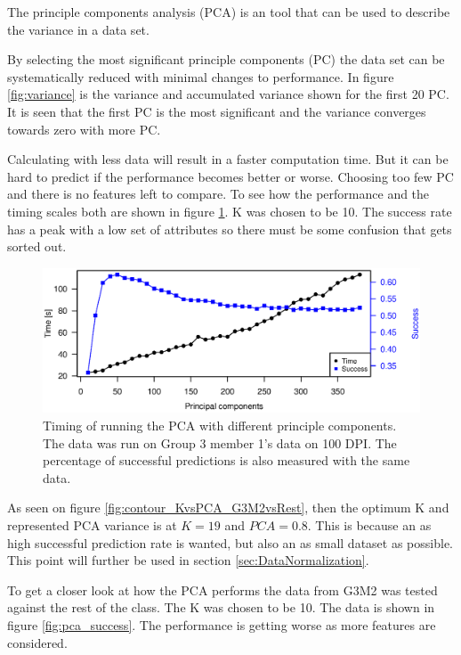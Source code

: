 The principle components analysis (PCA) is an tool that can be used to describe the variance in a data set.

By selecting the most significant principle components (PC) the data set can be systematically reduced with minimal changes to performance.
In figure \ref{fig:variance} is the variance and accumulated variance shown for the first 20 PC. 
It is seen that the first PC is the most significant and the variance converges towards zero with more PC.

Calculating with less data will result in a faster computation time. But it can be hard to predict if the performance becomes better or worse.
Choosing too few PC and there is no features left to compare.
To see how the performance and the timing scales both are shown in figure \ref{fig:pca_timing}. K was chosen to be 10.
The success rate has a peak with a low set of attributes so there must be some confusion that gets sorted out. 

\begin{figure}[h]
\centering
\includegraphics[width =0.8 \textwidth]{graphics/pca_timing_nikolaj}
\caption[Timing of PCA]{Timing of running the PCA with different principle components. 
The data was run on Group 3 member 1's data on 100 DPI. 
The percentage of successful predictions is also measured with the same data.}
\label{fig:pca_timing}
\end{figure}

As seen on figure \ref{fig:contour_KvsPCA_G3M2vsRest}, then the optimum K and represented PCA variance is at $K = 19$ and $PCA = 0.8$. 
This is because an as high successful prediction rate is wanted, but also an as small dataset as possible. 
This point will further be used in section \ref{sec:DataNormalization}.

To get a closer look at how the PCA performs the data from G3M2 was tested against the rest of the class. 
The K was chosen to be 10. 
The data is shown in figure \ref{fig:pca_success}.
The performance is getting worse as more features are considered.

